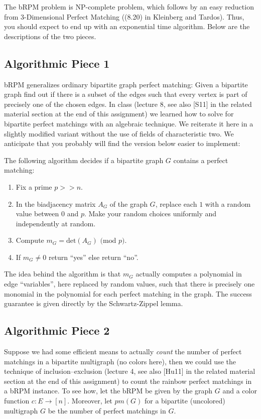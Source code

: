 \documentclass{tufte-handout}
\begin{document}
The bRPM problem is NP-complete problem, which follows by an easy
reduction from 3-Dimensional Perfect Matching ((8.20) in Kleinberg and
Tardos). Thus, you should expect to end up with an exponential time algorithm.
Below are the descriptions of the two pieces.

\subsection*{Algorithmic Piece 1}
bRPM generalizes ordinary bipartite graph perfect matching: Given a bipartite graph find out if there is a subset of the edges such that every vertex is part of precisely one of the chosen edges. In class (lecture 8, see also [S11] in the related material section at the end of this assignment) we learned how to solve for bipartite perfect matchings with an algebraic technique. We reiterate it here in a slightly modified variant without the use of  fields of characteristic two. We anticipate that you probably will find the version below easier to implement:

 The following algorithm decides if a bipartite graph $G$ contains a
 perfect matching:
\begin{enumerate}
\item Fix a prime $p>\!\!\!>n$.
\item In the biadjacency matrix $A_G$ of the graph $G$, replace each $1$ with a random value between $0$ and $p$. Make your random choices uniformly and independently at random.
\item Compute $m_G=\mbox{det}(A_G)\mbox{ (mod $p$)}$.
\item If $m_G\neq 0$ return ``yes'' else return ``no''.
\end{enumerate}

The idea behind the algorithm is that $m_G$ actually computes a polynomial in edge ``variables'', here replaced by random values, such that there is precisely one monomial in the polynomial for each perfect matching in the graph. The success guarantee is given directly by the Schwartz-Zippel lemma.

\subsection*{Algorithmic Piece 2}
Suppose we had some efficient means to actually \emph{count} the
number of perfect matchings in a bipartite multigraph (no colors
here), then we could use the technique of inclusion--exclusion
(lecture 4, see also [Hu11] in the related material section at the end
of this assignment) to count the rainbow perfect matchings in a bRPM
instance. To see how, let the bRPM be given by the graph $G$ and a
color function $c:E\rightarrow [n]$. Moreover, let $pm(G)$ for a
bipartite (uncolored) multigraph $G$ be the number of perfect
matchings in $G$.
\end{document}
